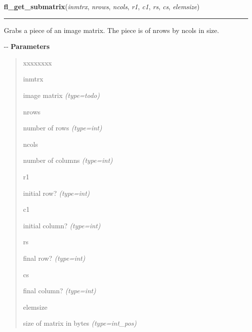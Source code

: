 \hspace{.8\funcindent}\begin{boxedminipage}{\funcwidth}

    \raggedright \textbf{fl\_get\_submatrix}(\textit{inmtrx}, \textit{nrows}, \textit{ncols}, \textit{r1}, \textit{c1}, \textit{rs}, \textit{cs}, \textit{elemsize})

    \vspace{-1.5ex}

    \rule{\textwidth}{0.5\fboxrule}
\setlength{\parskip}{2ex}

Grabs a piece of an image matrix. The piece is of nrows by ncols in
size.

-{}-
\setlength{\parskip}{1ex}
      \textbf{Parameters}
      \vspace{-1ex}

      \begin{quote}
        \begin{Ventry}{xxxxxxxx}

          \item[inmtrx]


image matrix
            {\it (type=\emph{todo})}

          \item[nrows]


number of rows
            {\it (type=int)}

          \item[ncols]


number of columns
            {\it (type=int)}

          \item[r1]


initial row?
            {\it (type=int)}

          \item[c1]


initial column?
            {\it (type=int)}

          \item[rs]


final row?
            {\it (type=int)}

          \item[cs]


final column?
            {\it (type=int)}

          \item[elemsize]


size of matrix in bytes
            {\it (type=int\_pos)}

        \end{Ventry}


\end{quote}
\end{boxedminipage}
